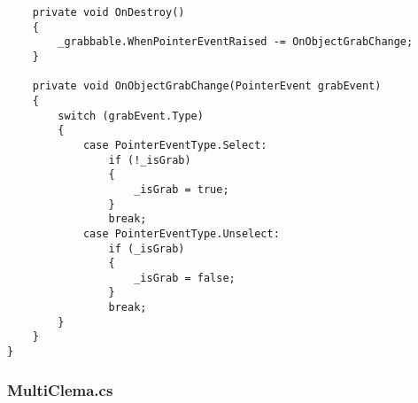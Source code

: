 \begin{verbatim}
    private void OnDestroy()
    {
        _grabbable.WhenPointerEventRaised -= OnObjectGrabChange;
    }

    private void OnObjectGrabChange(PointerEvent grabEvent)
    {
        switch (grabEvent.Type)
        {
            case PointerEventType.Select:
                if (!_isGrab)
                {
                    _isGrab = true;
                }
                break;
            case PointerEventType.Unselect:
                if (_isGrab)
                {
                    _isGrab = false;
                }
                break;
        }
    }
}

\end{verbatim}
\subsubsection*{MultiClema.cs}

